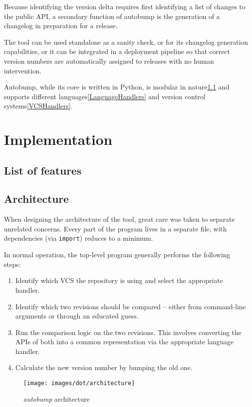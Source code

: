 \documentclass{l4proj}
\begin{document}
Because identifying the version delta requires first identifying a
list of changes to the public API, a secondary function of autobump is
the generation of a changelog in preparation for a release.

The tool can be used standalone as a sanity check, or for its
changelog generation capabilities, or it can be integrated in a
deployment pipeline so that correct version numbers are automatically
assigned to releases with no human intervention.

Autobump, while its core is written in Python, is modular in
nature\ref{Architecture} and supports different
languages\ref{LanguageHandlers} and version control
systems\ref{VCSHandlers}.

\chapter{Implementation}

\section{List of features}

\label{Architecture}
\section{Architecture}

\begin{minipage}{0.5\textwidth}
When designing the architecture of the tool, great care was taken to
separate unrelated concerns. Every part of the program lives in a
separate file, with dependencies (via \texttt{import}) reduces to a minimum.

In normal operation, the top-level program generally performs the
following steps:

\begin{enumerate}
\item Identify which VCS the repository is using and select the
appropriate handler.
\item Identify which two revisions should be compared -- either from
command-line arguments or through an educated guess.
\item Run the comparison logic on the two revisions. This involves
converting the APIs of both into a common representation via the
appropriate language handler.
\item Calculate the new version number by bumping the old one.
\end{enumerate}

\end{minipage}
\begin{minipage}{0.5\textwidth}
\begin{figure}[H]
\centering
\texttt{[image: images/dot/architecture]}
\caption{\textit{autobump} architecture}
\end{figure}
\end{minipage}
\end{document}
